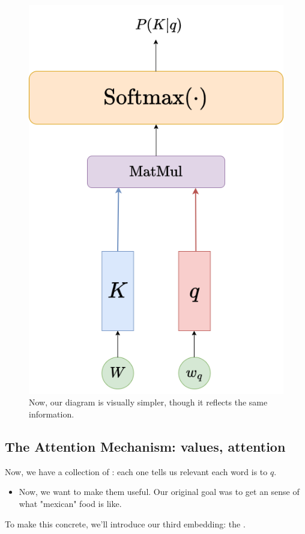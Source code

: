         \begin{figure}[H]
            \centering
            \includegraphics[width=0.3\linewidth]{images/transformers_images/condensed_attention_weights.png}
            \caption*{Now, our diagram is visually simpler, though it reflects the same information.}
        \end{figure}

        




    \phantom{}

    \subsection{The Attention Mechanism: values, attention}

        Now, we have a collection of : each one tells us relevant each word is to $q$.

        \begin{itemize}
            \item Now, we want to make them useful. Our original goal was to get an  sense of what "mexican" food is like.
        \end{itemize}

        To make this concrete, we'll introduce our third embedding: the .

